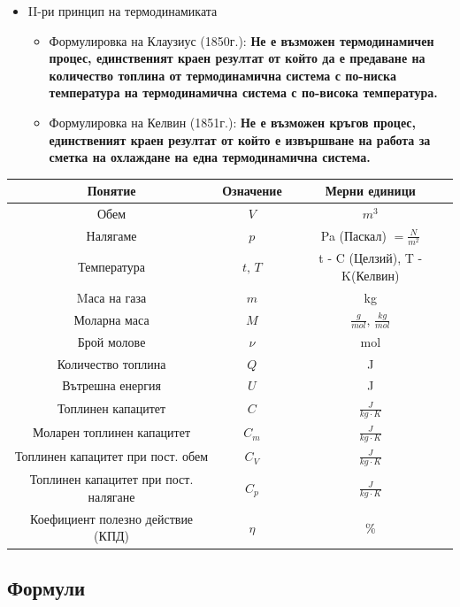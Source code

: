 \documentclass[fleqn, 12pt]{article}
\theoremstyle{definition}
\begin{document}
\begin{itemize}
\item II-ри принцип на термодинамиката 
\begin{itemize}
\item Формулировка на Клаузиус (1850г.): \textbf{Не е възможен термодинамичен процес,
единственият краен резултат от който да е предаване на количество топлина от
термодинамична система с по-ниска температура на термодинамична система с по-висока температура.}
\item Формулировка на Келвин (1851г.): \textbf{Не е възможен кръгов процес,
единственият краен резултат от който е извършване на работа за сметка на охлаждане на една термодинамична система.}
\end{itemize}
\end{itemize}

\begin{center}
\begin{tabular}{ |c|c|c|}
\hline
\textbf{Понятие} &\textbf{Означение} & \textbf{Мерни единици}\\
\hline
Обем & $V$ & $m^3$ \\
\hline
Налягаме & $p$ & Pa (Паскал) $ = \frac{N}{m^2}$ \\
\hline
Температура & $t, \, T$& t - C (Целзий), T - K(Келвин) \\
\hline
Mаса на газа& $m$ & kg\\
\hline
Моларна маса & $M$ & $\frac{g}{mol}, \, \frac{kg}{mol}$\\
\hline
Брой молове & $\nu$ & mol\\
\hline
Количество топлина & $Q$ & J \\
\hline
Вътрешна енергия & $U$ & J \\
\hline
Топлинен капацитет & $C$& $\frac{J}{kg \cdot K}$ \\
\hline
Моларен топлинен капацитет & $C_m$& $\frac{J}{kg \cdot K}$ \\
\hline
Топлинен капацитет при пост. обем & $C_V$& $\frac{J}{kg \cdot K}$ \\
\hline
Топлинен капацитет при пост. налягане& $C_p$& $\frac{J}{kg \cdot K}$ \\
\hline
Коефициент полезно действие (КПД)& $\eta$&  \% \\
\hline
\end{tabular}
\end{center}

\newpage
\subsection{Формули}
\end{document}

